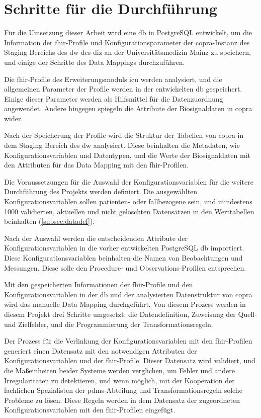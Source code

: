 \section{Schritte für die Durchführung} \label{sec:steps}

Für die Umsetzung dieser Arbeit wird eine \ac{db} in PostgreSQL entwickelt, um die Information der \ac{fhir}-Profile und Konfigurationsparameter der \ac{copra}-Instanz des Staging Bereichs des \ac{dw} des \ac{diz} an der Universitätsmedizin Mainz zu speichern, und einige der Schritte des Data Mappings durchzuführen.

Die \ac{fhir}-Profile des Erweiterungsmoduls \glqq\ac{icu}\grqq{} werden analysiert, und die allgemeinen Parameter der Profile werden in der entwickelten \ac{db} gespeichert. Einige dieser Parameter werden als Hilfsmittel für die Datenzuordnung angewendet. Andere hingegen spiegeln die Attribute der Biosignaldaten in \ac{copra} wider.

Nach der Speicherung der Profile wird die Struktur der Tabellen von \ac{copra} in dem Staging Bereich des \ac{dw} analysiert. Diese beinhalten die Metadaten, wie Konfigurationsvariablen und Datentypen, und die Werte der Biosignaldaten mit den Attributen für das Data Mapping mit den \ac{fhir}-Profilen. 

Die Voraussetzungen für die Auswahl der Konfigurationsvariablen für die weitere Durchführung des Projekts werden definiert. Die ausgewählten Konfigurationsvariablen sollen patienten- oder fallbezogene sein, und mindestens 1000 validierten, aktuellen und nicht gelöschten Datensätzen in den Werttabellen beinhalten (\ref{subsec:datadef}).

Nach der Auswahl werden die entscheidenden Attribute der Konfigurationsvariablen in die vorher entwickelten PostgreSQL \ac{db} importiert. Diese Konfigurationsvariablen beinhalten die Namen von Beobachtungen und Messungen. Diese solle den \glqq Procedure\grqq{}- und \glqq Observations\grqq{}-Profilen entsprechen.

Mit den gespeicherten Informationen der \ac{fhir}-Profile und den Konfigurationsvariablen in der \ac{db} und der analysierten Datenstruktur von \ac{copra} wird das manuelle Data Mapping durchgeführt. Von diesem Prozess werden in diesem Projekt drei Schritte umgesetzt: die Datendefinition, Zuweisung der Quell- und Zielfelder, und die Programmierung der Transformationsregeln.

Der Prozess für die Verlinkung der Konfigurationsvariablen mit den \ac{fhir}-Profilen generiert einen Datensatz mit den notwendigen Attributen der Konfigurationsvariablen und der \ac{fhir}-Profile. Dieser Datensatz wird validiert, und die Maßeinheiten beider Systeme werden verglichen, um Fehler und andere Irregularitäten zu detektieren, und wenn möglich, mit der Kooperation der fachlichen Spezialisten der \ac{pdms}-Abteilung und Transformationsregeln solche Probleme zu lösen. Diese Regeln werden in dem Datensatz der zugeordneten Konfigurationsvariablen mit den \ac{fhir}-Profilen eingefügt.

